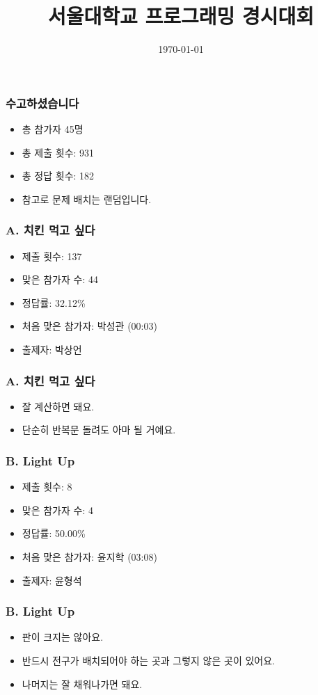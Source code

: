 \documentclass[xetex]{beamer}
\begin{document}
\title{서울대학교 프로그래밍 경시대회}
\date{\today} 

\frame{\titlepage} 

\begin{frame}
  \frametitle{수고하셨습니다}
  \begin{itemize}
    \item 총 참가자 45명
    \item 총 제출 횟수: 931
    \item 총 정답 횟수: 182
    \item 참고로 문제 배치는 랜덤입니다.
  \end{itemize}
\end{frame}

\begin{frame}
  \frametitle{A. 치킨 먹고 싶다}
  \begin{itemize}
    \item 제출 횟수: 137
    \item 맞은 참가자 수: 44
    \item 정답률: 32.12\%
    \item 처음 맞은 참가자: 박성관 (00:03)
    \item 출제자: 박상언
  \end{itemize}
\end{frame}

\begin{frame}
  \frametitle{A. 치킨 먹고 싶다}
  \begin{itemize}
    \item 잘 계산하면 돼요.
    \item 단순히 반복문 돌려도 아마 될 거예요.
  \end{itemize}
\end{frame}

\begin{frame}
  \frametitle{B. Light Up}
  \begin{itemize}
    \item 제출 횟수: 8
    \item 맞은 참가자 수: 4
    \item 정답률: 50.00\%
    \item 처음 맞은 참가자: 윤지학 (03:08)
    \item 출제자: 윤형석
  \end{itemize}
\end{frame}

\begin{frame}
  \frametitle{B. Light Up}
  \begin{itemize}
    \item 판이 크지는 않아요.
    \item 반드시 전구가 배치되어야 하는 곳과 그렇지 않은 곳이 있어요.
    \item 나머지는 잘 채워나가면 돼요.
  \end{itemize}
\end{frame}
\end{document}

